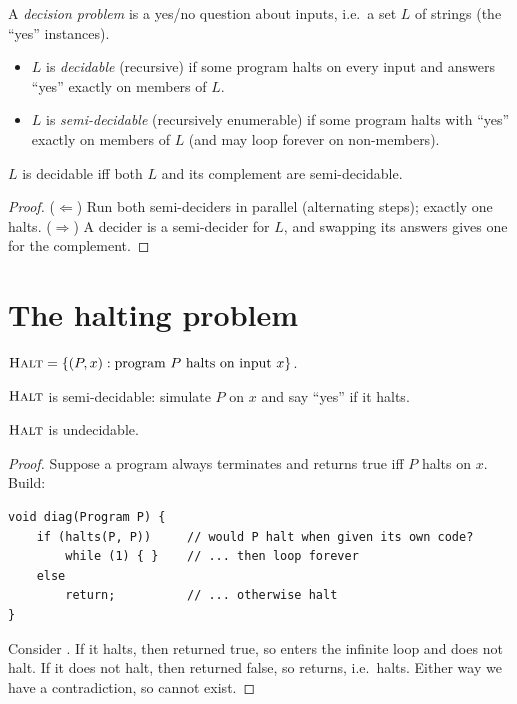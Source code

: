 \begin{definition}
A \emph{decision problem} is a yes/no question about inputs, i.e.\ a set $L$ of strings
(the ``yes'' instances).
\begin{itemize}
  \item $L$ is \emph{decidable} (recursive) if some program halts on every input and
        answers ``yes'' exactly on members of $L$.
  \item $L$ is \emph{semi-decidable} (recursively enumerable) if some program halts with
        ``yes'' exactly on members of $L$ (and may loop forever on non-members).
\end{itemize}
\end{definition}

\begin{theorem}
$L$ is decidable iff both $L$ and its complement are semi-decidable.
\end{theorem}
\begin{proof}
($\Leftarrow$) Run both semi-deciders in parallel (alternating steps); exactly one halts.
($\Rightarrow$) A decider is a semi-decider for $L$, and swapping its answers gives one for
the complement.
\end{proof}

\section{The halting problem}

\begin{definition}
$\textsc{Halt}=\{(P,x) : \text{program } P \text{ halts on input } x\}$.
\end{definition}

$\textsc{Halt}$ is semi-decidable: simulate $P$ on $x$ and say ``yes'' if it halts.

\begin{theorem}[Turing 1936]
$\textsc{Halt}$ is undecidable.
\end{theorem}
\begin{proof}
Suppose a program  always terminates and returns true iff $P$ halts on
$x$. Build:
\begin{lstlisting}[style=c]
void diag(Program P) {
    if (halts(P, P))     // would P halt when given its own code?
        while (1) { }    // ... then loop forever
    else
        return;          // ... otherwise halt
}
\end{lstlisting}
Consider . If it halts, then  returned true, so
 enters the infinite loop and does not halt. If it does not halt, then
 returned false, so  returns, i.e.\ halts. Either way
we have a contradiction, so  cannot exist.
\end{proof}


